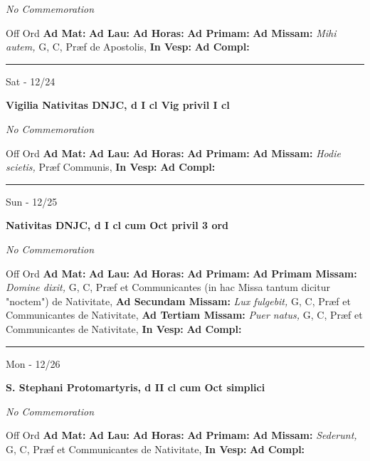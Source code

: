 \documentclass[letterpaper, 10pt]{article}
\begin{document}
\textit{No Commemoration}\begin{justify}
Off Ord
\textbf{Ad Mat: }
\textbf{Ad Lau: }
\textbf{Ad Horas: }
\textbf{Ad Primam: }
\textbf{Ad Missam:} \textit{Mihi autem, } G, C, Præf de Apostolis, 
\textbf{In Vesp: }
\textbf{Ad Compl: }\end{justify}



\hrule
\begin{center}
Sat - 12/24
\end{center}\textbf{ \large Vigilia Nativitas DNJC, \textnormal{\normalsize d I cl Vig privil I cl}}

\textit{No Commemoration}\begin{justify}
Off Ord
\textbf{Ad Mat: }
\textbf{Ad Lau: }
\textbf{Ad Horas: }
\textbf{Ad Primam: }
\textbf{Ad Missam:} \textit{Hodie scietis, } Præf Communis, 
\textbf{In Vesp: }
\textbf{Ad Compl: }\end{justify}



\hrule
\begin{center}
Sun - 12/25
\end{center}\textbf{ \large Nativitas DNJC, \textnormal{\normalsize d I cl cum Oct privil 3 ord}}

\textit{No Commemoration}\begin{justify}
Off Ord
\textbf{Ad Mat: }
\textbf{Ad Lau: }
\textbf{Ad Horas: }
\textbf{Ad Primam: }
\textbf{Ad Primam Missam:} \textit{Domine dixit, } G, C, Præf et Communicantes (in hac Missa tantum dicitur "noctem") de Nativitate, \textbf{Ad Secundam Missam:} \textit{Lux fulgebit, } G, C, Præf et Communicantes de Nativitate, \textbf{Ad Tertiam Missam:} \textit{Puer natus, } G, C, Præf et Communicantes de Nativitate, 
\textbf{In Vesp: }
\textbf{Ad Compl: }\end{justify}



\hrule
\begin{center}
Mon - 12/26
\end{center}\textbf{ \large S. Stephani Protomartyris, \textnormal{\normalsize d II cl cum Oct simplici}}

\textit{No Commemoration}\begin{justify}
Off Ord
\textbf{Ad Mat: }
\textbf{Ad Lau: }
\textbf{Ad Horas: }
\textbf{Ad Primam: }
\textbf{Ad Missam:} \textit{Sederunt, } G, C, Præf et Communicantes de Nativitate, 
\textbf{In Vesp: }
\textbf{Ad Compl: }\end{justify}
\end{document}
